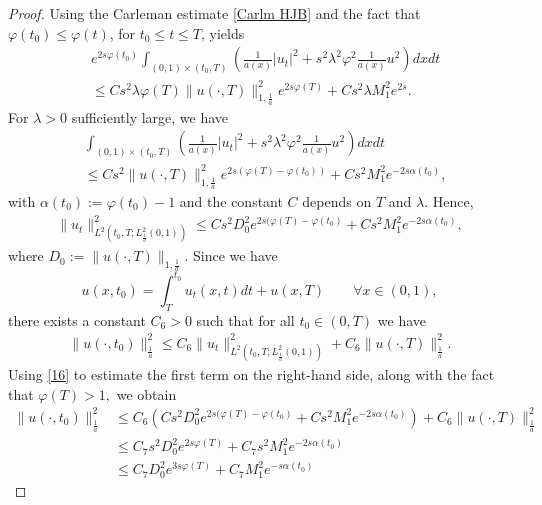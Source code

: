 \documentclass[reqno]{amsart}
\theoremstyle{plain}
\theoremstyle{remark}
\numberwithin{equation}{section}
\begin{document}
\begin{proof}
Using the Carleman estimate \eqref{Carlm HJB} and the fact that $\varphi(t_{0})\leq \varphi(t)$, for $t_{0}\leq t\leq T$, yields
    \begin{align*}
        &e^{2s\varphi(t_{0})}\int_{(0,1)\times (t_{0},T)} \left(\frac{1}{a(x)}\vert u_{t}\vert ^2 +s^2\lambda^2 \varphi^2 \frac{1}{a(x)}u^2\right)dx dt \\&\leqslant Cs^2\lambda \varphi(T)\| u(\cdot,T)\|_{1,\frac{1}{a}}^2 e^{2s\varphi(T)}+Cs^2\lambda M_1^2 e^{2s}.
    \end{align*}
For $\lambda>0$ sufficiently large, we have
 \begin{align*}
        &\int_{(0,1)\times (t_{0},T)} \left(\frac{1}{a(x)}\vert u_{t}\vert ^2 +s^2\lambda^2 \varphi^2 \frac{1}{a(x)}u^2\right)dx dt \\&\leqslant Cs^2\| u(\cdot,T)\|_{1,\frac{1}{a}}^2e^{2s(\varphi(T)-\varphi(t_{0}))} +Cs^2 M_1^2 e^{-2s\alpha(t_{0})},
    \end{align*}
    with $\alpha(t_{0}):=\varphi(t_{0})-1$ and the constant $C$ depends on $T$ and $\lambda$.  Hence,  
    \begin{align}\label{16}
        \| u_{t}\|_{L^{2}(t_{0},T;L^2_{\frac{1}{a}}(0,1))}^2 \leqslant Cs^2D_{0}^2e^{2s(\varphi(T)-\varphi(t_{0})}+Cs^2 M_1^2 e^{-2s\alpha(t_{0})},
    \end{align}
    where $D_{0}:=\| u(\cdot,T)\|_{1,\frac{1}{a}}.$
    Since we have 
    $$ u(x,t_{0})=\int_{T}^{t_{0}}u_{t}(x,t)dt +u(x,T)\qquad  \forall x \in (0,1),$$
there exists a constant $C_{6}>0$ such that for all $t_{0}\in (0,T)$ we have
\begin{align}
    \| u(\cdot,t_{0})\|_{\frac{1}{a}}^2\leqslant C_{6} \| u_{t}\|_{L^{2}(t_{0},T; L^2_{\frac{1}{a}}(0,1))}^2+ C_{6} \| u(\cdot,T)\|^2_{\frac{1}{a}}.
\end{align}
Using \eqref{16} to estimate the first term on the right-hand side, along with the fact that $\varphi(T)>1,$ we obtain
\begin{equation*}
    \begin{aligned}
        \| u(\cdot,t_{0})\|_{\frac{1}{a}}^2&\leqslant C_{6}\left( Cs^2D_{0}^2e^{2s(\varphi(T)-\varphi(t_{0})}+Cs^2 M_1^2 e^{-2s\alpha(t_{0})}\right)+  C_{6} \| u(\cdot,T)\|^2_{\frac{1}{a}}  \\&\leqslant 
C_{7}s^2D_{0}^2e^{2s\varphi(T)}+C_{7}s^2M_1^2e^{-2s\alpha(t_{0})} \\ & \leqslant C_{7}D_{0}^2e^{3s\varphi(T)} +C_{7}M_1^2e^{-s\alpha(t_{0})}
        \end{aligned}

\end{equation*}
\end{proof}
\end{document}

